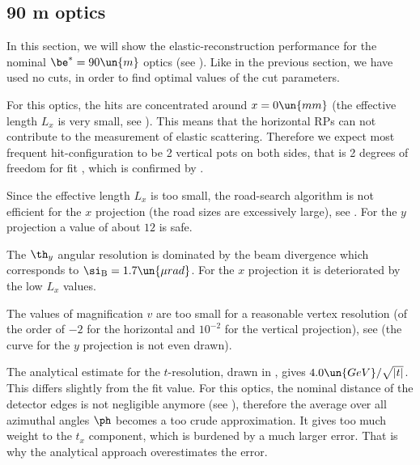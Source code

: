 \subsection[elr 90]{90 m optics}

In this section, we will show the elastic-reconstruction performance for the nominal $\be^* = 90\un{m}$ optics (see ). Like in the previous section, we have used no cuts, in order to find optimal values of the cut parameters.

For this optics, the hits are concentrated around $x=0\un{mm}$ (the effective length $L_x$ is very small, see ). This means that the horizontal RPs can not contribute to the measurement of elastic scattering. Therefore we expect most frequent hit-configuration to be 2 vertical pots on both sides, that is 2 degrees of freedom for fit , which is confirmed by .

Since the effective length $L_x$ is too small, the road-search algorithm is not efficient for the $x$ projection (the road sizes are excessively large), see . For the $y$ projection a value of about $12$ is safe.

\bmfig
{}
\emfig

The $\th_y$ angular resolution is dominated by the beam divergence which corresponds to $\si_{\rm B} = 1.7\un{\mu rad}$. For the $x$ projection it is deteriorated by the low $L_x$ values.

The values of magnification $v$ are too small for a reasonable vertex resolution (of the order of $-2$ for the horizontal and $10^{-2}$ for the vertical projection), see  (the curve for the $y$ projection is not even drawn).

\bmfig
{}
\emfig

The analytical estimate  for the $t$-resolution, drawn in , gives $4.0\un{GeV}/\sqrt{|t|}$. This differs slightly from the fit value. For this optics, the nominal distance of the detector edges is not negligible anymore (see ), therefore the average over all azimuthal angles $\ph$ becomes a too crude approximation. It gives too much weight to the $t_x$ component, which is burdened by a much larger error. That is why the analytical approach overestimates the error.

